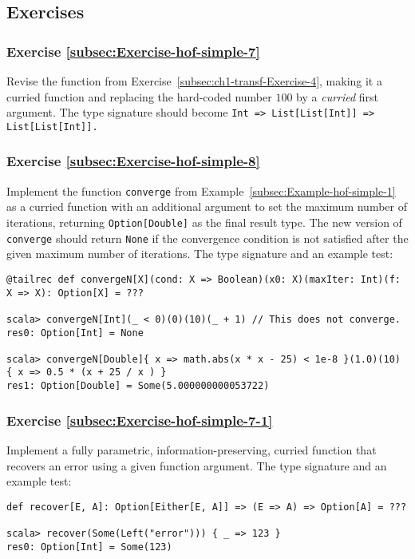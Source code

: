 \subsection{Exercises}

\subsubsection{Exercise \label{subsec:Exercise-hof-simple-7}\ref{subsec:Exercise-hof-simple-7}}

Revise the function from Exercise~\ref{subsec:ch1-transf-Exercise-4},
making it a curried function and replacing the hard-coded number $100$
by a \emph{curried} first argument. The type signature should become
\texttt{}\lstinline!Int => List[List[Int]] => List[List[Int]]!\texttt{.}

\subsubsection{Exercise \label{subsec:Exercise-hof-simple-8}\ref{subsec:Exercise-hof-simple-8}}

Implement the function \lstinline!converge! from Example~\ref{subsec:Example-hof-simple-1}
as a curried function with an additional argument to set the maximum
number of iterations, returning \lstinline!Option[Double]! as the
final result type. The new version of \lstinline!converge! should
return \lstinline!None! if the convergence condition is not satisfied
after the given maximum number of iterations. The type signature and
an example test:
\begin{lstlisting}
@tailrec def convergeN[X](cond: X => Boolean)(x0: X)(maxIter: Int)(f: X => X): Option[X] = ???

scala> convergeN[Int](_ < 0)(0)(10)(_ + 1) // This does not converge.
res0: Option[Int] = None

scala> convergeN[Double]{ x => math.abs(x * x - 25) < 1e-8 }(1.0)(10) { x => 0.5 * (x + 25 / x ) }
res1: Option[Double] = Some(5.000000000053722)
\end{lstlisting}


\subsubsection{Exercise \label{subsec:Exercise-hof-simple-7-1}\ref{subsec:Exercise-hof-simple-7-1}}

Implement a fully parametric, information-preserving, curried function
that recovers an error using a given function argument. The type signature
and an example test:
\begin{lstlisting}
def recover[E, A]: Option[Either[E, A]] => (E => A) => Option[A] = ???

scala> recover(Some(Left("error"))) { _ => 123 }
res0: Option[Int] = Some(123)
\end{lstlisting}


